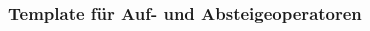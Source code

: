 %
%
%
\bgroup
\begin{frame}[t]
\setlength{\abovedisplayskip}{5pt}
\setlength{\belowdisplayskip}{5pt}
\frametitle{Template für Auf- und Absteigeoperatoren}
\vspace{-20pt}
\begin{columns}[t,onlytextwidth]
\begin{column}{0.48\textwidth}
\end{column}
\begin{column}{0.48\textwidth}
\end{column}
\end{columns}
\end{frame}
\egroup
